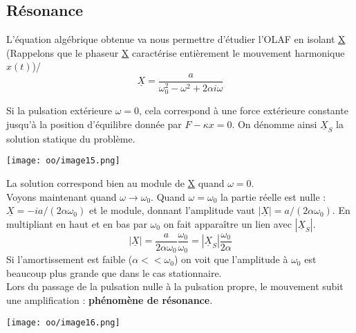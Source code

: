 \documentclass[british,french,11pt, a4paper, openany]{book}
\begin{document}
	\subsection{Résonance}
	L'équation algébrique obtenue va nous permettre d'étudier l'OLAF en isolant \underline{X} (Rappelons que le phaseur \underline{X} caractérise entièrement le mouvement harmonique $x(t)$)/
	\begin{equation}
		\underline{X} = \frac{a}{\omega_0^2 - \omega^2 + 2\alpha i\omega}
	\end{equation}
	
	Si la pulsation extérieure $\omega = 0$, cela correspond à une force extérieure constante jusqu'à la position d'équilibre donnée par $F - \kappa x = 0$. On dénomme ainsi $\underline{X}_S$ la solution statique  du problème.
	\begin{center}
		\texttt{[image: oo/image15.png]}
	\end{center}
	La solution correspond bien au module de \underline{X} quand $\omega = 0$.\\
	
	Voyons maintenant quand $\omega \rightarrow \omega_0$. Quand $\omega = \omega_0$ la partie réelle est nulle : $\underline{X} = -ia/(2\alpha\omega_0)$ et le module, donnant l'amplitude vaut $|\underline{X}| = a/(2\alpha\omega_0)$. En multipliant en haut et en bas par $\omega_0$ on fait apparaître un lien avec $|\underline{X}_S|$.
	\begin{equation}
		|\underline{X}| = \frac{a}{2\alpha\omega_0}\frac{\omega_0}{\omega_0} = |\underline{X}_S|\frac{\omega_0}{2\alpha}
	\end{equation}
	Si l'amortissement est faible ($\alpha << \omega_0$) on voit que l'amplitude à $\omega_0$ est beaucoup plus grande que dans le cas stationnaire.\\
	Lors du passage de la pulsation nulle à la pulsation propre, le mouvement subit une amplification : \textbf{phénomène de résonance}.
	\begin{center}
		\texttt{[image: oo/image16.png]}
	\end{center}
\end{document}
